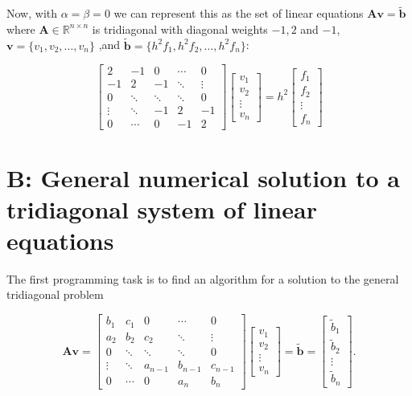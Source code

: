 \documentclass[]{article}
\begin{document}
Now, with $\alpha = \beta = 0$ we can represent this as the set of linear equations $\mathbf{Av} = \mathbf{\tilde{b}}$ where $\mathbf{A} \in \mathbb{R}^{n \times n}$ is tridiagonal with diagonal weights $-1, 2$ and $-1$, $\mathbf{v} = \{v_1, v_2, \ldots, v_n\}$ ,and $\mathbf{\tilde{b}} = \{h^{2}f_1, h^{2}f_2, \ldots, h^{2}f_n\}$:

\begin{equation*}
\left[ \begin{matrix}
2 & -1 & 0 & \cdots & 0 \\
-1 & 2 & -1 & \ddots & \vdots \\
0 & \ddots & \ddots & \ddots & 0\\
\vdots & \ddots & -1 & 2 & -1 \\
0 & \cdots & 0 & -1 & 2
\end{matrix} \right]
\left[ \begin{matrix}
v_1 \\
v_2 \\
\vdots \\
v_n
\end{matrix} \right] = 
h^{2} \left[ \begin{matrix}
f_1 \\
f_2 \\
\vdots \\
f_n
\end{matrix} \right]
\end{equation*}



\section*{B: General numerical solution to a tridiagonal system of linear equations}
The first programming task is to find an algorithm for a solution to the general tridiagonal problem

\begin{equation*}
\mathbf{Av} = 
\left[ \begin{matrix}
b_1 & c_1 & 0 & \cdots & 0 \\
a_2 & b_2 & c_2 & \ddots & \vdots \\
0 & \ddots & \ddots & \ddots & 0 \\
\vdots & \ddots & a_{n-1} & b_{n-1} & c_{n-1} \\
0 & \cdots & 0 & a_n & b_n
\end{matrix} \right]
\left[ \begin{matrix}
v_1 \\
v_2 \\
\vdots \\
v_n
\end{matrix} \right] = 
\mathbf{\tilde{b}} = 
\left[ \begin{matrix}
\tilde{b}_1 \\
\tilde{b}_2 \\
\vdots \\
\tilde{b}_n
\end{matrix} \right] .
\end{equation*}
\end{document}
